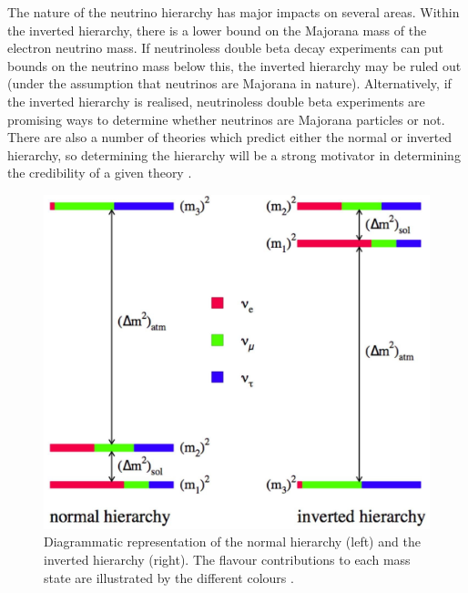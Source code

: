 The nature of the neutrino hierarchy has major impacts on several areas. Within the inverted hierarchy, there is a lower bound on the Majorana mass of the electron neutrino mass. If neutrinoless double beta decay experiments can put bounds on the neutrino mass below this, the inverted hierarchy may be ruled out (under the assumption that neutrinos are Majorana in nature). Alternatively, if the inverted hierarchy is realised, neutrinoless double beta experiments are promising ways to determine whether neutrinos are Majorana particles or not. There are also a number of theories which predict either the normal or inverted hierarchy, so determining the hierarchy will be a strong motivator in determining the credibility of a given theory \cite{mass_hierarchy}.

\begin{figure}[h!]
    \centering
    \includegraphics[width = \largefigwidth]{figures-chap2/mass_hierarchy.jpg}
    \caption[Neutrino hierarchy.]{Diagrammatic representation of the normal hierarchy (left) and the inverted hierarchy (right). The flavour contributions to each mass state are illustrated by the different colours \cite{mass_hierarchy_image}.}
    \label{fig:my_label}
\end{figure}


